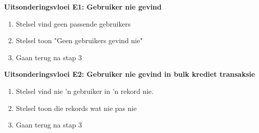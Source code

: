 \textbf{Uitsonderingsvloei E1: Gebruiker nie gevind}
\begin{enumerate}
    \item[4a.] Stelsel vind geen passende gebruikers
    \item Stelsel toon "Geen gebruikers gevind nie"
    \item Gaan terug na stap 3
\end{enumerate}

\textbf{Uitsonderingsvloei E2: Gebruiker nie gevind in bulk krediet transaksie}
\begin{enumerate}
    \item[4b.] Stelsel vind nie 'n gebruiker in 'n rekord nie.
    \item Stelsel toon die rekords wat nie pas nie
    \item Gaan terug na stap 3
\end{enumerate}

